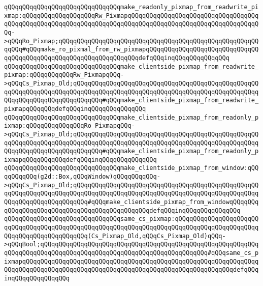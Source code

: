 \verb|qQQqqQQqqQQqqQQqqQQqqQQqqQQqqQQqmake_readonly_pixmap_from_readwrite_pixmap:qQQqqQQqqQQqqQQqqQQqRw_PixmapqQQqqQQqqQQqqQQqqQQqqQQqqQQqqQQqqQQqqQQqqQQqqQQqqQQqqQQqqQQqqQQqqQQqqQQqqQQqqQQqqQQqqQQqqQQqqQQqqQQqqQQqqQQq->qQQqRo_Pixmap;qQQqqQQqqQQqqQQqqQQqqQQqqQQqqQQqqQQqqQQqqQQqqQQqqQQqqQQqqQQq#qQQqmake_ro_pixmal_from_rw_pixmapqQQqqQQqqQQqqQQqqQQqqQQqqQQqqQQqqQQqqQQqqQQqqQQqqQQqqQQqqQQqqQQqqQQqdefqQQqinqQQqqQQqqQQqqQQq|\newline
\newline
\verb|qQQqqQQqqQQqqQQqqQQqqQQqqQQqqQQqmake_clientside_pixmap_from_readwrite_pixmap:qQQqqQQqqQQqRw_PixmapqQQq->qQQqCs_Pixmap_Old;qQQqqQQqqQQqqQQqqQQqqQQqqQQqqQQqqQQqqQQqqQQqqQQqqQQqqQQqqQQqqQQqqQQqqQQqqQQqqQQqqQQqqQQqqQQqqQQqqQQqqQQqqQQqqQQqqQQqqQQqqQQqqQQqqQQqqQQqqQQqqQQqqQQq#qQQqmake_clientside_pixmap_from_readwrite_pixmapqQQqqQQqdefqQQqinqQQqqQQqqQQqqQQq|\newline
\verb|qQQqqQQqqQQqqQQqqQQqqQQqqQQqqQQqmake_clientside_pixmap_from_readonly_pixmap:qQQqqQQqqQQqqQQqRo_PixmapqQQq->qQQqCs_Pixmap_Old;qQQqqQQqqQQqqQQqqQQqqQQqqQQqqQQqqQQqqQQqqQQqqQQqqQQqqQQqqQQqqQQqqQQqqQQqqQQqqQQqqQQqqQQqqQQqqQQqqQQqqQQqqQQqqQQqqQQqqQQqqQQqqQQqqQQqqQQqqQQqqQQqqQQq#qQQqmake_clientside_pixmap_from_readonly_pixmapqQQqqQQqqQQqdefqQQqinqQQqqQQqqQQqqQQq|\newline
\verb|qQQqqQQqqQQqqQQqqQQqqQQqqQQqqQQqmake_clientside_pixmap_from_window:qQQqqQQqqQQq(g2d::Box,qQQqWindow)qQQqqQQqqQQq->qQQqCs_Pixmap_Old;qQQqqQQqqQQqqQQqqQQqqQQqqQQqqQQqqQQqqQQqqQQqqQQqqQQqqQQqqQQqqQQqqQQqqQQqqQQqqQQqqQQqqQQqqQQqqQQqqQQqqQQqqQQqqQQqqQQqqQQqqQQqqQQqqQQqqQQqqQQqqQQq#qQQqmake_clientside_pixmap_from_windowqQQqqQQqqQQqqQQqqQQqqQQqqQQqqQQqqQQqqQQqqQQqqQQqdefqQQqinqQQqqQQqqQQqqQQq|\newline
\newline
\verb|qQQqqQQqqQQqqQQqqQQqqQQqqQQqqQQqsame_cs_pixmap:qQQqqQQqqQQqqQQqqQQqqQQqqQQqqQQqqQQqqQQqqQQqqQQqqQQqqQQqqQQqqQQqqQQqqQQqqQQqqQQqqQQqqQQqqQQqqQQqqQQqqQQqqQQqqQQqqQQq(Cs_Pixmap_Old,qQQqCs_Pixmap_Old)qQQq->qQQqBool;qQQqqQQqqQQqqQQqqQQqqQQqqQQqqQQqqQQqqQQqqQQqqQQqqQQqqQQqqQQqqQQqqQQqqQQqqQQqqQQqqQQqqQQqqQQqqQQqqQQqqQQqqQQqqQQqqQQq#qQQqsame_cs_pixmapqQQqqQQqqQQqqQQqqQQqqQQqqQQqqQQqqQQqqQQqqQQqqQQqqQQqqQQqqQQqqQQqqQQqqQQqqQQqqQQqqQQqqQQqqQQqqQQqqQQqqQQqqQQqqQQqqQQqqQQqqQQqqQQqdefqQQqinqQQqqQQqqQQqqQQq|\newline
